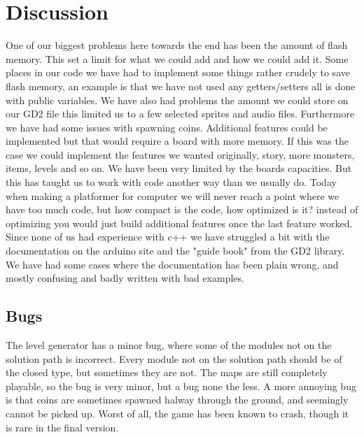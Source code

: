\chapter{Discussion}
One of our biggest problems here towards the end has been the amount of flash memory. This set a limit for what we could add and how we could add it. Some places in our code we have had to implement some things rather crudely to save flash memory, an example is that we have not used any getters/setters all is done with public variables. We have also had problems the amount we could store on our GD2 file this limited us to a few selected sprites and audio files.
\newline
Furthermore we have had some issues with spawning coins.
\newline
Additional features could be implemented but that would require a board with more memory. If this was the case we could implement the features we wanted originally, story, more monsters, items, levels and so on.
\newline
We have been very limited by the boards capacities. But this has taught us to work with code another way than we usually do. Today when making a platformer for computer we will never reach a point where we have too much code, but how compact is the code, how optimized is it? instead of optimizing you would just build additional features once the last feature worked. Since none of us had experience with c++ we have struggled a bit with the documentation on the arduino site and the "guide book" from the GD2 library. We have had some cases where the documentation has been plain wrong, and mostly confusing and badly written with bad examples.

\section{Bugs} %
The level generator has a minor bug, where some of the modules not on the solution path is incorrect. Every module not on the solution path should be of the closed type, but sometimes they are not. The maps are still completely playable, so the bug is very minor, but a bug none the less.
\newline
A more annoying bug is that coins are sometimes spawned halway through the ground, and seemingly cannot be picked up.
\newline
Worst of all, the game has been known to crash, though it is rare in the final version.

